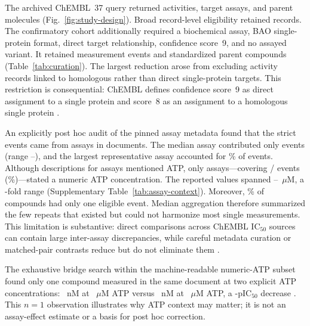 \documentclass[11pt]{article}
\begin{document}
The archived ChEMBL~37 query returned \SnapshotActivityCount{} activities,
\SnapshotAssayCount{} target assays, and \SnapshotParentCount{} parent molecules
(Fig.~\ref{fig:study-design}). Broad record-level eligibility retained
\BroadEligibleCount{} records. The confirmatory cohort additionally required a
biochemical assay, BAO single-protein format, direct target relationship,
confidence score~9, and no assayed variant. It retained \StrictEventCount{}
measurement events and \StrictCompoundCount{} standardized parent compounds
(Table~\ref{tab:curation}). The largest reduction arose from excluding
\HomologousExcludedCount{} activity records linked to homologous rather than
direct single-protein targets. This restriction is consequential: ChEMBL defines
confidence score~9 as direct assignment to a single protein and score~8 as an
assignment to a homologous single protein \citep{zdrazil2024chembl}.

An explicitly post hoc audit of the pinned assay metadata found that the strict
events came from \StrictAssayContextCount{} assays in
\StrictDocumentContextCount{} documents. The median assay contributed only
\AssayEventMedian{} events (range \AssayEventMinimum{}--\AssayEventMaximum{}),
and the largest representative assay accounted for
\LargestAssayEventPercent{}\% of events. Although descriptions for
\ATPDescriptionAssayCount{} assays mentioned ATP, only
\NumericATPAssayCount{} assays---covering
\NumericATPEventCount{}/\StrictEventCount{} events
(\NumericATPEventPercent{}\%)---stated a numeric ATP concentration. The reported
values spanned \ATPMinimumMicromolar{}--\ATPMaximumMicromolar{}~$\mu$M, a
\ATPFoldRange{}-fold range (Supplementary Table~\ref{tab:assay-context}).
Moreover, \SingleEventCompoundPercent{}\% of compounds had only one eligible
event. Median aggregation therefore summarized the few repeats that
existed but could not harmonize most single measurements. This limitation is
substantive: direct comparisons across ChEMBL IC$_{50}$ sources can contain large
inter-assay discrepancies, while careful metadata curation or matched-pair
contrasts reduce but do not eliminate them
\citep{landrum2024noise,nelen2025matched}.

The exhaustive bridge search within the machine-readable numeric-ATP subset
found only one compound measured in the same document at two explicit ATP
concentrations: \MatchedATPLowNanomolar{}~nM at
\MatchedATPLowMicromolar{}~$\mu$M ATP versus
\MatchedATPHighNanomolar{}~nM at \MatchedATPHighMicromolar{}~$\mu$M ATP, a
\MatchedATPShift{}-pIC$_{50}$ decrease \citep{dakin2012pim}. This $n=1$
observation illustrates why ATP context may matter; it is not an assay-effect
estimate or a basis for post hoc correction.
\end{document}
